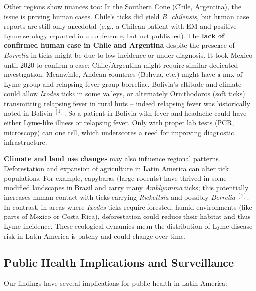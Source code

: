 \documentclass[11pt,letterpaper]{article}
\newcommand{\mycite}[1]{$^{[#1]}$}
\begin{document}
Other regions show nuances too: In the Southern Cone (Chile, Argentina), the issue is proving human cases. Chile's ticks did yield \textit{B. chilensis}, but human case reports are still only anecdotal (e.g., a Chilean patient with EM and positive Lyme serology reported in a conference, but not published). The \textbf{lack of confirmed human case in Chile and Argentina} despite the presence of \textit{Borrelia} in ticks might be due to low incidence or under-diagnosis. It took Mexico until 2020 to confirm a case; Chile/Argentina might require similar dedicated investigation. Meanwhile, Andean countries (Bolivia, etc.) might have a mix of Lyme-group and relapsing fever group borreliae. Bolivia's altitude and climate could allow \textit{Ixodes} ticks in some valleys, or alternately Ornithodoros (soft ticks) transmitting relapsing fever in rural huts – indeed relapsing fever was historically noted in Bolivia \mycite{1}. So a patient in Bolivia with fever and headache could have either Lyme-like illness or relapsing fever. Only with proper lab tests (PCR, microscopy) can one tell, which underscores a need for improving diagnostic infrastructure.

\textbf{Climate and land use changes} may also influence regional patterns. Deforestation and expansion of agriculture in Latin America can alter tick populations. For example, capybaras (large rodents) have thrived in some modified landscapes in Brazil and carry many \textit{Amblyomma} ticks; this potentially increases human contact with ticks carrying \textit{Rickettsia} and possibly \textit{Borrelia} \mycite{1}. In contrast, in areas where \textit{Ixodes} ticks require forested, humid environments (like parts of Mexico or Costa Rica), deforestation could reduce their habitat and thus Lyme incidence. These ecological dynamics mean the distribution of Lyme disease risk in Latin America is patchy and could change over time.

\subsection{Public Health Implications and Surveillance}
Our findings have several implications for public health in Latin America:
\end{document}
